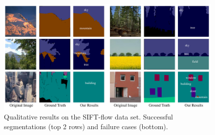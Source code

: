 \begin{figure}
\begin{center}
    \includegraphics[width=1\linewidth]{Fig_SIFTflow.pdf}
\end{center}
\vspace{-3mm}
\caption{Qualitative results on the SIFT-flow data set. Successful segmentations (top 2 rows) and failure cases (bottom).}
\label{fig:SIFT-flow}
\end{figure}


